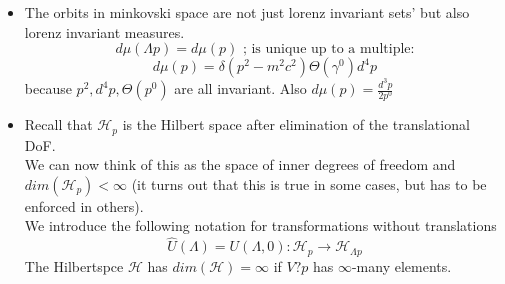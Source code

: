 \documentclass{report}
\begin{document}
\begin{itemize}
  \item The orbits in minkovski space are not just lorenz invariant sets' but also lorenz invariant measures. \[
      d \mu \left( \Lambda p \right) = d\mu(p) \text{ ; is unique up to a multiple:}
  \] \[
  d \mu(p) = \delta\left( p^2 - m^2c^2 \right) \Theta\left( \gamma^0 \right) d^4p
\] because $p^2, d^4p, \Theta(p^0)$ are all invariant. Also $d \mu\left( p \right) = \frac{d^3p}{2 p^0}$
\item Recall that $\mathcal{H}_p$ is the Hilbert space after elimination of the translational DoF. \\
  We can now think of this as the space of inner degrees of freedom and $dim\left( \mathcal{H}_p \right) < \infty$ (it turns out that this is true in some cases, but has to be enforced in others).\\
  We introduce the following notation for transformations without translations \[
    \hat{U}\left( \Lambda \right) = U\left( \Lambda, 0 \right) : \mathcal{H}_p \to \mathcal{H}_{\Lambda p}
  \] The Hilbertspce $\mathcal{H}$ has $dim\left( \mathcal{H} \right) = \infty$ if $V ? p$ has $\infty$-many elements.
\end{itemize}
\end{document}
